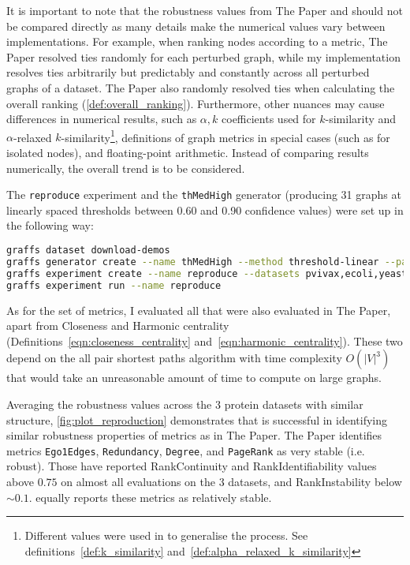 \label{para:how_to_compare_results}
It is important to note that the robustness values from The Paper and \graffs should not be compared directly as many details make the numerical values vary between implementations.
For example, when ranking nodes according to a metric, The Paper resolved ties randomly for each perturbed graph, while my implementation resolves ties arbitrarily but predictably and constantly across all perturbed graphs of a dataset.
The Paper also randomly resolved ties when calculating the overall ranking (\autoref{def:overall_ranking}).
Furthermore, other nuances may cause differences in numerical results, such as $\alpha,k$ coefficients used for $k$-similarity and $\alpha$-relaxed $k$-similarity\footnote{Different values were used in \graffs to generalise the process. See definitions~\ref{def:k_similarity} and~\ref{def:alpha_relaxed_k_similarity}}, definitions of graph metrics in special cases (such as for isolated nodes), and floating-point arithmetic.
Instead of comparing results numerically, the overall trend is to be considered.

The \texttt{reproduce} experiment and the \texttt{thMedHigh} generator (producing 31 graphs at linearly spaced thresholds between 0.60 and 0.90 confidence values) were set up in the following way:
\begin{lstlisting}[language=bash]
graffs dataset download-demos
graffs generator create --name thMedHigh --method threshold-linear --params 600,900 -n 31 --seed 7
graffs experiment create --name reproduce --datasets pvivax,ecoli,yeast --generator thMedHigh --metrics Betweenness,Degree,Ego1Edges,Ego2Nodes,LocalClustering,PageRank,Redundancy --robustnessMeasures RankIdentifiability,RankInstability,RankContinuity
graffs experiment run --name reproduce
\end{lstlisting}

As for the set of metrics, I evaluated all that were also evaluated in The Paper, apart from Closeness and Harmonic centrality (Definitions~\ref{eqn:closeness_centrality} and~\ref{eqn:harmonic_centrality}).
These two depend on the all pair shortest paths algorithm with time complexity $O({\left\lvert V \right\rvert}^3)$ that would take an unreasonable amount of time to compute on large graphs.



Averaging the robustness values across the 3 protein datasets with similar structure, \autoref{fig:plot_reproduction} demonstrates that \graffs is successful in identifying similar robustness properties of metrics as in The Paper.
The Paper identifies metrics \texttt{Ego1Edges}, \texttt{Redundancy}, \texttt{Degree}, and \texttt{PageRank} as very stable (i.e. robust).
Those have reported RankContinuity and RankIdentifiability values above $0.75$ on almost all evaluations on the 3 datasets, and RankInstability below $\sim 0.1$.
\graffs equally reports these metrics as relatively stable.

